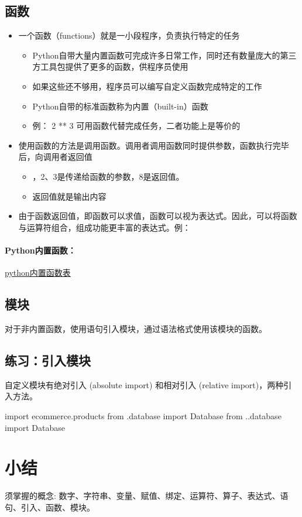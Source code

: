 \subsection{函数}
\begin{itemize}
\item 一个函数（functions）就是一小段程序，负责执行特定的任务
  \begin{itemize}
  \item Python自带大量内置函数可完成许多日常工作，同时还有数量庞大的第三方工具包提供了更多的函数，供程序员使用
  \item 如果这些还不够用，程序员可以编写自定义函数完成特定的工作
  \item Python自带的标准函数称为内置（built-in）函数
  \item 例： 2 ** 3 可用函数代替完成任务，二者功能上是等价的
  \end{itemize}
\item 使用函数的方法是调用函数。调用者调用函数同时提供参数，函数执行完毕后，向调用者返回值
  \begin{itemize}
  \item {}，2、3是传递给函数的参数，8是返回值。
  \item {}返回值就是输出内容
  \end{itemize}
\item 由于函数返回值，即函数可以求值，函数可以视为表达式。因此，可以将函数与运算符组合，组成功能更丰富的表达式。例：
\end{itemize}
\paragraph{Python内置函数：}
\href{https://docs.python.org/3/library/functions.html}{python内置函数表}
\subsection{模块}
对于非内置函数，使用语句引入模块，通过语法格式使用该模块的函数。
\subsection{练习：引入模块}
自定义模块有绝对引入 (absolute import) 和相对引入 (relative import)，两种引入方法。
\begin{python}
  import ecommerce.products
  from .database import Database
  from ..database import Database
\end{python}

\section{小结}
须掌握的概念: 数字、字符串、变量、赋值、绑定、运算符、算子、表达式、语句、引入、函数、模块。
